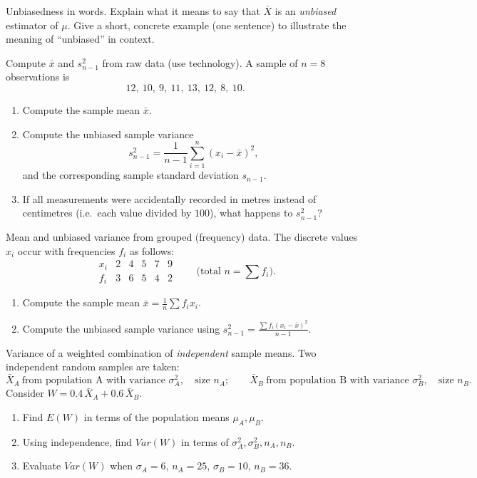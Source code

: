 \documentclass[11pt]{article}
\def\textbf#1{#1}%
\def\mathbb#1{#1}%
\def\mathrm#1{#1}%
\newcounter{question}
\begin{document}
\begin{question}
\textbf{Unbiasedness in words.}
Explain what it means to say that $\bar X$ is an \emph{unbiased} estimator of $\mu$.
Give a short, concrete example (one sentence) to illustrate the meaning of “unbiased” in context.
\end{question}

\begin{question}
\textbf{Compute $\bar x$ and $s^2_{n-1}$ from raw data (use technology).}
A sample of $n=8$ observations is
\[
12,\ 10,\ 9,\ 11,\ 13,\ 12,\ 8,\ 10.
\]
\begin{enumerate}
  \item Compute the sample mean $\bar x$.
  \item Compute the unbiased sample variance
  \[
  s^2_{n-1}=\frac{1}{n-1}\sum_{i=1}^n (x_i-\bar x)^2,
  \]
  and the corresponding sample standard deviation $s_{n-1}$.
  \item If all measurements were accidentally recorded in metres instead of centimetres (i.e.\ each value divided by $100$), what happens to $s^2_{n-1}$?
\end{enumerate}
\end{question}

\begin{question}
\textbf{Mean and unbiased variance from grouped (frequency) data.}
The discrete values $x_i$ occur with frequencies $f_i$ as follows:
\[
\begin{array}{c|ccccc}
x_i    & 2 & 4 & 5 & 7 & 9\\\hline
f_i    & 3 & 6 & 5 & 4 & 2
\end{array}
\qquad\text{(total }n=\sum f_i\text{)}.
\]
\begin{enumerate}
  \item Compute the sample mean
  $\displaystyle \bar x=\frac{1}{n}\sum f_i x_i$.
  \item Compute the unbiased sample variance using
  $\displaystyle s^2_{n-1}=\frac{\sum f_i(x_i-\bar x)^2}{n-1}$.
\end{enumerate}
\end{question}

\begin{question}
\textbf{Variance of a weighted combination of \emph{independent} sample means.}
Two independent random samples are taken:
\[
\bar X_A\ \text{from population A with variance }\sigma_A^2,\quad \text{size }n_A;\qquad
\bar X_B\ \text{from population B with variance }\sigma_B^2,\quad \text{size }n_B.
\]
Consider $W=0.4\,\bar X_A+0.6\,\bar X_B$.
\begin{enumerate}
  \item Find $\mathbb E(W)$ in terms of the population means $\mu_A,\mu_B$.
  \item Using independence, find $\mathrm{Var}(W)$ in terms of $\sigma_A^2,\sigma_B^2,n_A,n_B$.
  \item Evaluate $\mathrm{Var}(W)$ when $\sigma_A=6$, $n_A=25$, $\sigma_B=10$, $n_B=36$.
\end{enumerate}
\end{question}
\end{document}
